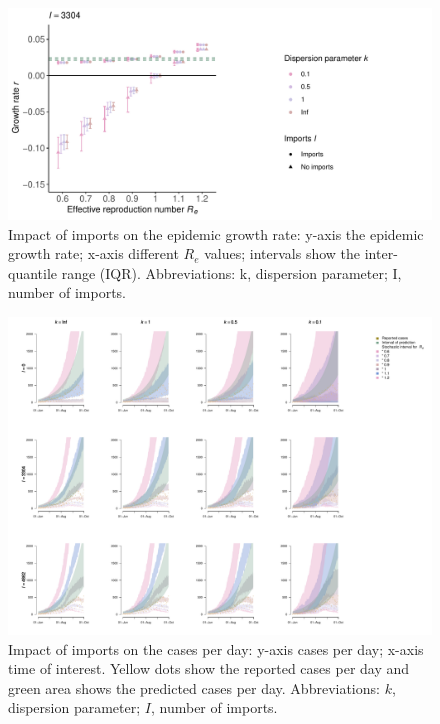\documentclass[10pt, a4paper, twoside]{article}
\begin{document}
\begin{figure}[h]
\centering
\includegraphics[scale=0.5]{growth_r_imports_infect_reported_2021-02-24.pdf}
\caption{Impact of imports on the epidemic growth rate: y-axis the epidemic growth rate; x-axis different $R_e$ values; intervals show the inter-quantile range (IQR). Abbreviations: k, dispersion parameter; I, number of imports.}
\end{figure}
\begin{multicols}{2}

\end{multicols}
\begin{figure}[h]
\centering
\includegraphics[scale=0.4]{sim3_cases_d_imports_infect_2021-02-24.pdf}
\caption{Impact of imports on the cases per day: y-axis cases per day; x-axis time of interest. Yellow dots show the reported cases per day and green area shows the predicted cases per day. Abbreviations: $k$, dispersion parameter; $I$, number of imports.}
\end{figure}
\end{document}
